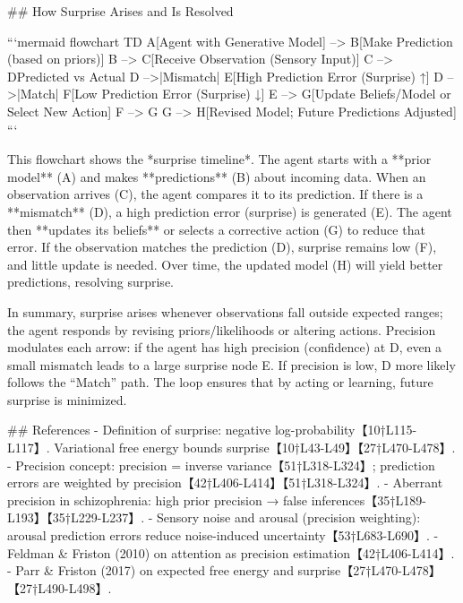\documentclass[a4paper]{article}
\begin{document}
    ## How Surprise Arises and Is Resolved
    
    ```mermaid
    flowchart TD
        A[Agent with Generative Model] --> B[Make Prediction (based on priors)]
        B --> C[Receive Observation (Sensory Input)]
        C --> D{Predicted vs Actual}
        D -->|Mismatch| E[High Prediction Error (Surprise) ↑]
        D -->|Match| F[Low Prediction Error (Surprise) ↓]
        E --> G[Update Beliefs/Model or Select New Action]
        F --> G
        G --> H[Revised Model; Future Predictions Adjusted]
    ```
    
    This flowchart shows the *surprise timeline*.  The agent starts with a **prior model** (A) and makes **predictions** (B) about incoming data.  When an observation arrives (C), the agent compares it to its prediction.  If there is a **mismatch** (D), a high prediction error (surprise) is generated (E).  The agent then **updates its beliefs** or selects a corrective action (G) to reduce that error.  If the observation matches the prediction (D), surprise remains low (F), and little update is needed.  Over time, the updated model (H) will yield better predictions, resolving surprise.
    
    In summary, surprise arises whenever observations fall outside expected ranges; the agent responds by revising priors/likelihoods or altering actions.  Precision modulates each arrow: if the agent has high precision (confidence) at D, even a small mismatch leads to a large surprise node E.  If precision is low, D more likely follows the “Match” path.  The loop ensures that by acting or learning, future surprise is minimized.
    
    ## References
    - Definition of surprise: negative log-probability【10†L115-L117】. Variational free energy bounds surprise【10†L43-L49】【27†L470-L478】.
    - Precision concept: precision = inverse variance【51†L318-L324】; prediction errors are weighted by precision【42†L406-L414】【51†L318-L324】.
    - Aberrant precision in schizophrenia: high prior precision → false inferences【35†L189-L193】【35†L229-L237】.
    - Sensory noise and arousal (precision weighting): arousal prediction errors reduce noise-induced uncertainty【53†L683-L690】.
    - Feldman & Friston (2010) on attention as precision estimation【42†L406-L414】.
    - Parr & Friston (2017) on expected free energy and surprise【27†L470-L478】【27†L490-L498】.
    
 


\end{document}
